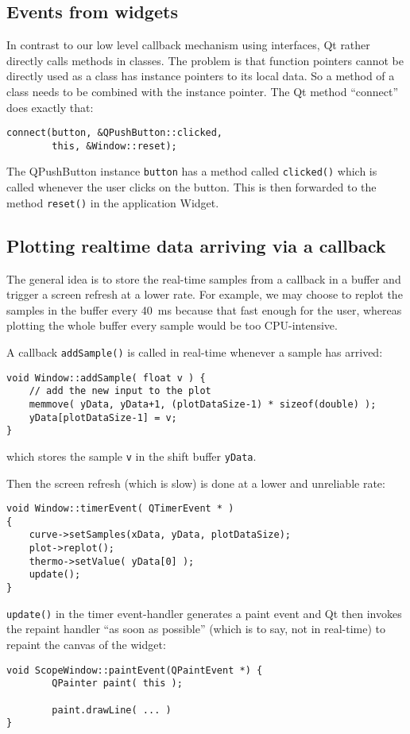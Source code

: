 \documentclass[12pt]{report}
\begin{document}
\subsection{Events from widgets}
In contrast to our low level callback mechanism using interfaces, Qt rather
directly calls methods in classes. The problem is that function pointers
cannot be directly used as a class has instance pointers to its local
data. So a method of a class needs to be combined with the instance
pointer. The Qt method ``connect'' does exactly that:
\begin{verbatim}
connect(button, &QPushButton::clicked,
        this, &Window::reset);
\end{verbatim}
The QPushButton instance \texttt{button} has a method called \texttt{clicked()} which is
called whenever the user clicks on the button. This is then forwarded to the
method \texttt{reset()} in the application Widget.


\subsection{Plotting realtime data arriving via a callback}
The general idea is to store the real-time samples from a callback in a
buffer and trigger a screen refresh at a lower rate. For example, we may
choose to replot the samples in the buffer every
40~ms because that fast enough for the user, whereas plotting the
whole buffer every sample would be too CPU-intensive.

A callback \texttt{addSample()} is called in real-time whenever
a sample has arrived:
\begin{verbatim}
void Window::addSample( float v ) {
    // add the new input to the plot
    memmove( yData, yData+1, (plotDataSize-1) * sizeof(double) );
    yData[plotDataSize-1] = v;
}
\end{verbatim}
which stores the sample \texttt{v} in the shift buffer \texttt{yData}.

Then the screen refresh (which is slow) is done at
a lower and unreliable rate:
\begin{verbatim}
void Window::timerEvent( QTimerEvent * )
{
    curve->setSamples(xData, yData, plotDataSize);
    plot->replot();
    thermo->setValue( yData[0] );
    update();
}
\end{verbatim}

\texttt{update()} in the timer event-handler generates a
paint event and Qt then invokes the repaint
handler ``as soon as possible'' (which is to say, not in real-time) to repaint
the canvas of the widget:
\begin{verbatim}
void ScopeWindow::paintEvent(QPaintEvent *) {
        QPainter paint( this );

        paint.drawLine( ... )
}
\end{verbatim}
\end{document}
